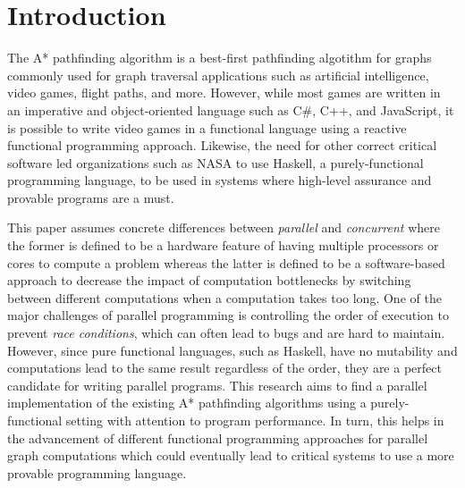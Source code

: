 \chapter{Introduction}
The A* pathfinding algorithm is a best-first pathfinding algotithm for graphs commonly used 
for graph traversal applications such as artificial intelligence, video games, flight paths, and more.
However, while most games are written in an imperative and object-oriented language such as C\#, C++, and 
JavaScript, it is possible to write video games in a functional language using a reactive 
functional programming approach.\cite{Cheong2006} Likewise, the need for other correct critical software 
led organizations such as NASA to use Haskell\cite{HaskellSite}, a purely-functional programming language, to 
be used in systems where high-level assurance and provable programs are a must.\cite{NasaCopilot2020}

This paper assumes concrete differences between \emph{parallel} and \emph{concurrent} where the former 
is defined to be a hardware feature of having multiple processors or cores to compute a problem whereas the 
latter is defined to be a software-based approach to decrease the impact of computation bottlenecks by 
switching between different computations when a computation takes too long.\cite{SilberschatzGalvin2012} One of the major challenges 
of parallel programming is controlling the order of execution to prevent \emph{race conditions}, 
which can often lead to bugs and are hard to maintain. However, since pure functional languages, such as Haskell,
have no mutability and computations lead to the same result regardless of the order, they are a perfect candidate 
for writing parallel programs.\cite{Hammond2011}
This research aims to find a parallel implementation of the existing A* pathfinding algorithms using a 
purely-functional setting with attention to program performance. In turn, this helps in the advancement 
of different functional programming approaches for parallel graph computations which could eventually lead
to critical systems to use a more provable programming language.



